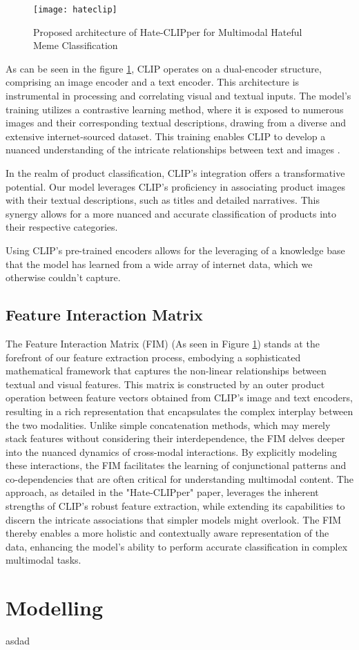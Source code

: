 \begin{figure}[H]
    \centering
    \texttt{[image: hateclip]}
    \caption{Proposed architecture of Hate-CLIPper for Multimodal Hateful Meme Classification \cite{radford-2021}}
    \label{fig:architecture}
\end{figure}

As can be seen in the figure \ref{fig:architecture}, CLIP operates on a dual-encoder structure, comprising an image encoder and a text encoder. This architecture is instrumental in processing and correlating visual and textual inputs. The model's training utilizes a contrastive learning method, where it is exposed to numerous images and their corresponding textual descriptions, drawing from a diverse and extensive internet-sourced dataset. This training enables CLIP to develop a nuanced understanding of the intricate relationships between text and images \cite{radford-2021}.

In the realm of product classification, CLIP's integration offers a transformative potential. Our model leverages CLIP's proficiency in associating product images with their textual descriptions, such as titles and detailed narratives. This synergy allows for a more nuanced and accurate classification of products into their respective categories.

Using CLIP's pre-trained encoders allows for the leveraging of a knowledge base that the model has learned from a wide array of internet data, which we otherwise couldn't capture.

\subsection{Feature Interaction Matrix}
The Feature Interaction Matrix (FIM) (As seen in Figure \ref{fig:architecture}) stands at the forefront of our feature extraction process, embodying a sophisticated mathematical framework that captures the non-linear relationships between textual and visual features. This matrix is constructed by an outer product operation between feature vectors obtained from CLIP’s image and text encoders, resulting in a rich representation that encapsulates the complex interplay between the two modalities. Unlike simple concatenation methods, which may merely stack features without considering their interdependence, the FIM delves deeper into the nuanced dynamics of cross-modal interactions. By explicitly modeling these interactions, the FIM facilitates the learning of conjunctional patterns and co-dependencies that are often critical for understanding multimodal content. The approach, as detailed in the "Hate-CLIPper" paper, leverages the inherent strengths of CLIP’s robust feature extraction, while extending its capabilities to discern the intricate associations that simpler models might overlook. The FIM thereby enables a more holistic and contextually aware representation of the data, enhancing the model's ability to perform accurate classification in complex multimodal tasks.

\section{Modelling}
asdad

